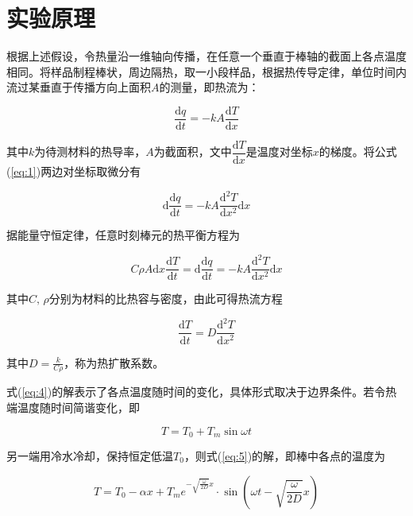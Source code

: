 \documentclass[12pt]{article}
\begin{document}
\section{实验原理}
根据上述假设，令热量沿一维轴向传播，在任意一个垂直于棒轴的截面上各点温度相同。将样品制程棒状，周边隔热，取一小段样品，根据热传导定律，单位时间内流过某垂直于传播方向上面积$A$的测量，即热流为：

\begin{equation}\label{eq:1}
    \frac{\mathrm{d}q}{\mathrm{d}t}=-kA\frac{{\mathrm{d}T}}{\mathrm{d}x}
\end{equation}

其中$k$为待测材料的热导率，$A$为截面积，文中$\dfrac{{\mathrm{d}T}}{\mathrm{d}x}$是温度对坐标$x$的梯度。将公式(\ref{eq:1})两边对坐标取微分有

\begin{equation}\label{eq:2}
    \mathrm{d}\frac{{\mathrm{d}q}}{\mathrm{d}t}=-kA\frac{{\mathrm{d}^2T}}{\mathrm{d}x^2}\mathrm{d}x
\end{equation}

据能量守恒定律，任意时刻棒元的热平衡方程为

\begin{equation}
    C\rho A\mathrm{d}x\frac{\mathrm{d}T}{\mathrm{d}t}=\mathrm{d}\frac{\mathrm{d}q}{\mathrm{d}t}=-kA\frac{{\mathrm{d}^2T}}{\mathrm{d}x^2}\mathrm{d}x
\end{equation}

其中$ C,\,\rho $分别为材料的比热容与密度，由此可得热流方程

\begin{equation}\label{eq:4}
    \frac{\mathrm{d}T}{\mathrm{d}t}=D\frac{\mathrm{d}^2T}{\mathrm{d}x^2}
\end{equation}

其中$D=\frac{k}{C\rho}$，称为热扩散系数。

式(\ref{eq:4})的解表示了各点温度随时间的变化，具体形式取决于边界条件。若令热端温度随时间简谐变化，即

\begin{equation}\label{eq:5}
    T=T_0+T_m\sin\omega t
\end{equation}

另一端用冷水冷却，保持恒定低温$ T_0 $，则式(\ref{eq:5})的解，即棒中各点的温度为

\begin{equation}\label{eq:6}
    T=T_0-\alpha x+T_me^{-\sqrt{\frac{\omega}{2D}}x}\cdot\sin(\omega t-\sqrt{\frac{\omega}{2D}}x)
\end{equation}
\end{document}
